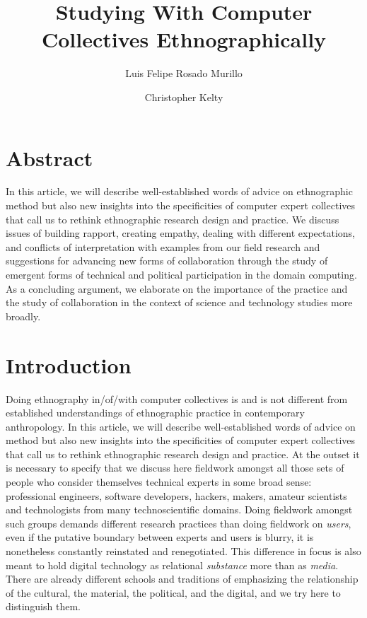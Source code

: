 \documentclass[10pt,letter,oneside]{scrartcl}
\author[1]{Luis Felipe Rosado Murillo}
\author[2]{Christopher Kelty}
\affil[1]{Berkman Center for Internet and Society, Harvard}
\affil[2]{Institute for Society and Genetics, Department of Anthropology, and Department of Information Studies, UCLA}
\title{Studying With Computer Collectives Ethnographically}
\date{}
\begin{document}
\maketitle
\section{Abstract}
In this article, we will describe well-established words of advice 
on ethnographic method but also new insights into the specificities 
of computer expert collectives that call us to rethink ethnographic 
research design and practice. We discuss issues of building rapport, 
creating empathy, dealing with different expectations, and conflicts 
of interpretation with examples from our field research and suggestions
for advancing new forms of collaboration through the study of emergent 
forms of technical and political participation in the domain computing. 
As a concluding argument, we elaborate on the importance of the practice
and the study of collaboration in the context of science and technology 
studies more broadly.

\doublespacing
\section{Introduction}

Doing ethnography in/of/with computer collectives is and is not
different from established understandings of ethnographic practice in
contemporary anthropology. In this article, we will describe 
well-established words of advice on method but also new insights 
into the specificities of computer expert collectives that call us to
rethink ethnographic research design and practice.  At the outset it
is necessary to specify that we discuss here fieldwork amongst all
those sets of people who consider themselves technical experts in some
broad sense: professional engineers, software developers, hackers, 
makers, amateur scientists and technologists from many technoscientific
domains.  Doing fieldwork amongst such groups demands different research 
practices than doing fieldwork on \emph{users}, even if the putative 
boundary between experts and users is blurry, it is nonetheless constantly
reinstated and renegotiated.  This difference in focus is also meant to 
hold digital technology as relational \emph{substance} more than as \emph{media}.  
There are already different schools and traditions of emphasizing the 
relationship of the cultural, the material, the political, and the digital, 
and we try here to distinguish them.
\end{document}
